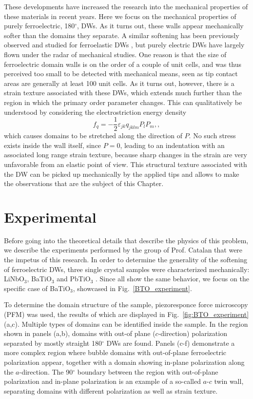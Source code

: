 These developments have increased the research into the mechanical properties of these materials in recent years. Here we focus on the mechanical properties of purely ferroelectric, 180$^\circ$, DWs.
As it turns out, these walls appear mechanically softer than the domains they separate.
A similar softening has been previously observed and studied for ferroelastic DWs \cite{Lee2003}, but purely electric DWs have largely flown under the radar of mechanical studies.
One reason is that the size of ferroelectric domain walls is on the order of a couple of unit cells, and was thus perceived too small to be detected with mechanical means, seen as tip contact areas are generally at least 100 unit cells.
As it turns out, however, there is a strain texture associated with these DWs, which extends much further than the region in which the primary order parameter changes.
This can qualitatively be understood by considering the electrostriction energy density
\begin{equation}
f_{q}=-\frac{1}{2}\varepsilon_{jk}q_{jklm}P_{l}P_{m},\label{eq:qpp},
\end{equation}
which causes domains to be stretched along the direction of $P$.
No such stress exists inside the wall itself, since $P=0$, leading to an indentation with an associated long range strain texture, because sharp changes in the strain are very unfavorable from an elastic point of view.
This structural texture associated with the DW can be picked up mechanically by the applied tips and allows to make the observations that are the subject of this Chapter.

\section{Experimental}
Before going into the theoretical details that describe the physics of this problem, we describe the experiments performed by the group of Prof. Catalan that were the impetus of this research.
In order to determine the generality of the softening of ferroelectric DWs, three single crystal samples were characterized mechanically: LiNbO$_3$, BaTiO$_3$ and PbTiO$_3$ \cite{Stefani2020}. Since all show the same behavior, we focus on the specific case of BaTiO$_3$, showcased in Fig.~\ref{BTO_experiment}.

To determine the domain structure of the sample, piezoresponce force microscopy (PFM)\cite{Harnagea2001} was used, the results of which are displayed in Fig.~\ref{fig:BTO_experiment}(a,c).
Multiple types of domains can be identified inside the sample.
In the region shown in panels (a,b), domains with out-of plane ($c$-direction) polarization separated by mostly straight 180$^\circ$ DWs are found.
Panels (c-f) demonstrate a more complex region where bubble domains with out-of-plane ferroelectric polarization appear, together with a domain showing in-plane polarization along the $a$-direction.
The 90$^\circ$ boundary between the region with out-of-plane polarization and in-plane polarization is an example of a so-called $a$-$c$ twin wall, separating domains with different polarization as well as strain texture.

